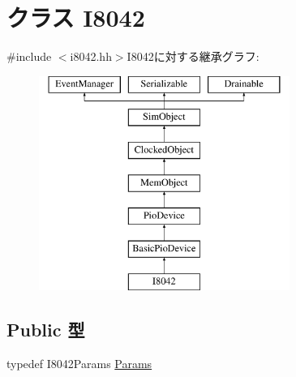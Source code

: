 \hypertarget{classX86ISA_1_1I8042}{
\section{クラス I8042}
\label{classX86ISA_1_1I8042}
}


{\ttfamily \#include $<$i8042.hh$>$}I8042に対する継承グラフ:\begin{figure}[H]
\begin{center}
\leavevmode
\includegraphics[height=7cm]{classX86ISA_1_1I8042}
\end{center}
\end{figure}
\subsection*{Public 型}
\begin{DoxyCompactItemize}
\item 
typedef I8042Params \hyperlink{classX86ISA_1_1I8042_ae70fe038127f3e2a71a81dde45f38dc5}{Params}
\end{DoxyCompactItemize}
